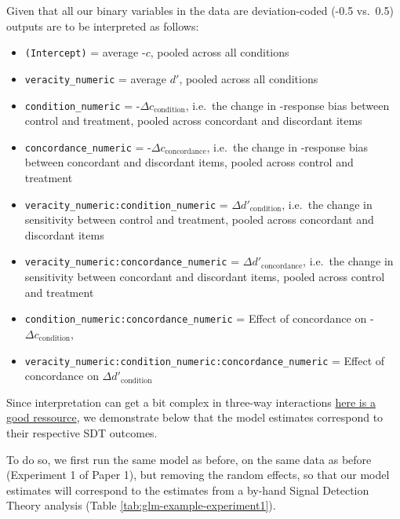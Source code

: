 \documentclass[
  man,mask,floatsintext]{apa6}
\providecommand{\tightlist}{%
  \setlength{\itemsep}{0pt}\setlength{\parskip}{0pt}}
\begin{document}
Given that all our binary variables in the data are deviation-coded (-0.5 vs.~0.5) outputs are to be interpreted as follows:

\begin{itemize}
\tightlist
\item
  \texttt{(Intercept)} = average -\(c\), pooled across all conditions
\item
  \texttt{veracity\_numeric} = average \(d'\), pooled across all conditions
\item
  \texttt{condition\_numeric} = -\(\Delta c_{\text{condition}}\), i.e.~the change in -response bias between control and treatment, pooled across concordant and discordant items
\item
  \texttt{concordance\_numeric} = -\(\Delta c_{\text{concordance}}\), i.e.~the change in -response bias between concordant and discordant items, pooled across control and treatment
\item
  \texttt{veracity\_numeric:condition\_numeric} = \(\Delta d'_{\text{condition}}\), i.e.~the change in sensitivity between control and treatment, pooled across concordant and discordant items
\item
  \texttt{veracity\_numeric:concordance\_numeric} = \(\Delta d'_{\text{concordance}}\), i.e.~the change in sensitivity between concordant and discordant items, pooled across control and treatment
\item
  \texttt{condition\_numeric:concordance\_numeric} = Effect of concordance on -\(\Delta c_{\text{condition}}\),
\item
  \texttt{veracity\_numeric:condition\_numeric:concordance\_numeric} = Effect of concordance on \(\Delta d'_{\text{condition}}\)
\end{itemize}

Since interpretation can get a bit complex in three-way interactions \href{https://psyteachr.github.io/stat-models-v1/interactions.html\#the-key-coding-schemes}{here is a good ressource}, we demonstrate below that the model estimates correspond to their respective SDT outcomes.

To do so, we first run the same model as before, on the same data as before (Experiment 1 of Paper 1), but removing the random effects, so that our model estimates will correspond to the estimates from a by-hand Signal Detection Theory analysis (Table \ref{tab:glm-example-experiment1}).
\end{document}
